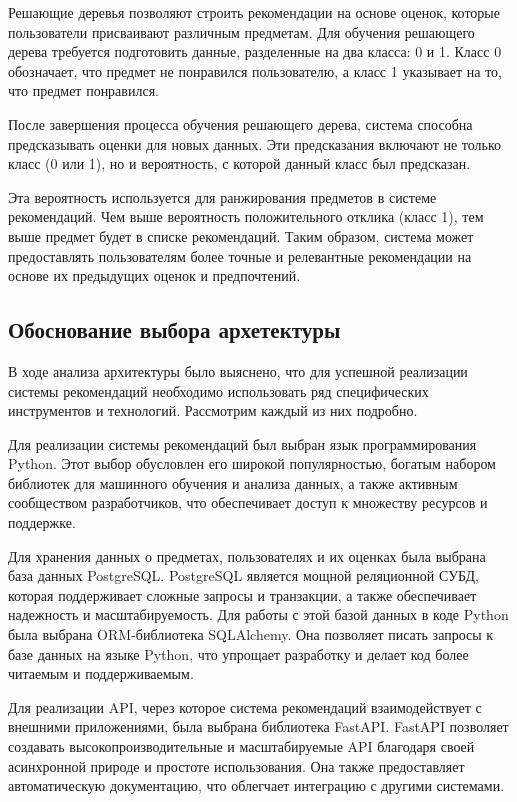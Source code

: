 Решающие деревья позволяют строить рекомендации на основе оценок, которые пользователи присваивают различным предметам.
Для обучения решающего дерева требуется подготовить данные, разделенные на два класса: 0 и 1.
Класс 0 обозначает, что предмет не понравился пользователю, а класс 1 указывает на то, что предмет понравился.

После завершения процесса обучения решающего дерева, система способна предсказывать оценки для новых данных.
Эти предсказания включают не только класс (0 или 1), но и вероятность, с которой данный класс был предсказан.

Эта вероятность используется для ранжирования предметов в системе рекомендаций.
Чем выше вероятность положительного отклика (класс 1), тем выше предмет будет в списке рекомендаций.
Таким образом, система может предоставлять пользователям более точные и релевантные рекомендации на основе их предыдущих
оценок и предпочтений.


\subsection{Обоснование выбора архетектуры}
В ходе анализа архитектуры было выяснено, что для успешной реализации системы рекомендаций необходимо использовать ряд
специфических инструментов и технологий.
Рассмотрим каждый из них подробно.

Для реализации системы рекомендаций был выбран язык программирования Python.
Этот выбор обусловлен его широкой популярностью, богатым набором библиотек для машинного обучения и анализа данных,
а также активным сообществом разработчиков, что обеспечивает доступ к множеству ресурсов и поддержке.

Для хранения данных о предметах, пользователях и их оценках была выбрана база данных PostgreSQL.
PostgreSQL является мощной реляционной СУБД, которая поддерживает сложные запросы и транзакции,
а также обеспечивает надежность и масштабируемость.
Для работы с этой базой данных в коде Python была выбрана ORM-библиотека SQLAlchemy.
Она позволяет писать запросы к базе данных на языке Python, что упрощает разработку и делает код более читаемым
и поддерживаемым.

Для реализации API, через которое система рекомендаций взаимодействует с внешними приложениями, была выбрана библиотека
FastAPI\@.
FastAPI позволяет создавать высокопроизводительные и масштабируемые API благодаря своей асинхронной природе и простоте
использования.
Она также предоставляет автоматическую документацию, что облегчает интеграцию с другими системами.

